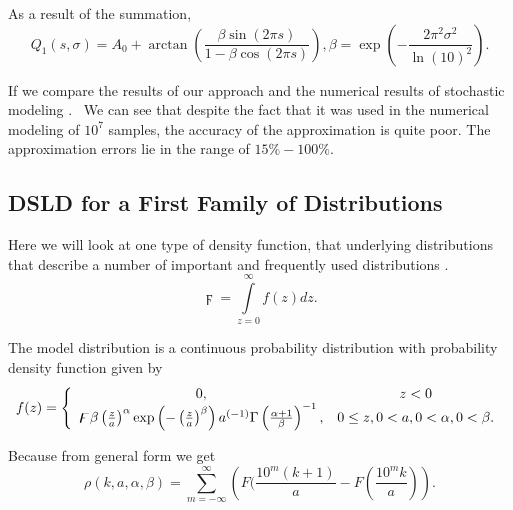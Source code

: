 \documentclass[titlepage,fleqn]{article}%
\begin{document}
As a result of the summation,%
\begin{equation}
Q_{1}\left(  s,\sigma\right)  =A_{0}+\arctan\left(  \frac{\beta\sin(2\pi
s)}{1-\beta\cos(2\pi s)}\right)  ,\beta=\exp\left(  -\frac{2\pi^{2}\sigma^{2}%
}{\ln(10)^{2}}\right)  .
\end{equation}


If we compare the results of our approach and the numerical results of
stochastic modeling
\cite{formann0}%
. \ We can see that despite the fact that it was used in the numerical
modeling of $10^{7}$ samples, the accuracy of the approximation is quite poor.
The approximation errors lie in the range of $15\%-100\%$.

\subsection{DSLD for a First Family of Distributions}%

\label{DfWD}%


Here we will look at one type of density function, that underlying
distributions that describe a number of important and frequently used
distributions
\cite{walck}
.%
\[
\digamma=%
{\displaystyle\int\limits_{z=0}^{\infty}}
f(z)dz.
\]


The model distribution is a continuous probability distribution with
probability density function given by%
\begin{equation}
f(z)=\left\{
\begin{array}
[c]{cc}%
0, & z<0\\
\digamma\beta\left(  \frac{z}{a}\right)  ^{\alpha}\exp\left(  -\left(
\frac{z}{a}\right)  ^{\beta}\right)  a^{(-1)}\Gamma\left(  \frac{\alpha
+1}{\beta}\right)  ^{-1}, & 0\leq z,0<a,0<\alpha,0<\beta.
\end{array}
\right.  \label{defWD}%
\end{equation}


Because from general form we get
\begin{equation}
\rho(k,a,\alpha,\beta)=%
{\displaystyle\sum\limits_{m=-\infty}^{\infty}}
\left(  F(\frac{10^{m}(k+1)}{a}-F\left(  \frac{10^{m}k}{a}\right)  \right)  .
\label{WA_rho}%
\end{equation}
\end{document}
